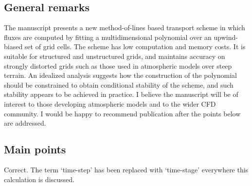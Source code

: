 \documentclass[times]{elsarticle}
\begin{document}
\subsection*{General remarks}

The manuscript presents a new method-of-lines based transport scheme
in which fluxes are computed by fitting a multidimensional
polynomial over an upwind-biased set of grid cells. The scheme
has low computation and memory costs. It is suitable for
structured and unstructured grids, and maintains accuracy
on strongly distorted grids such as those used in atmospheric models
over steep terrain. An idealized analysis suggests how the
construction of the polynomial should be constrained to obtain
conditional stability of the scheme, and such stability appears
to be achieved in practice.
I believe the manuscript will be of interest to those developing
atmospheric models and to the wider CFD community. I would be happy to
recommend publication after the points below are addressed.


\subsection*{Main points}

\begin{quotation}
\begin{comment}
\setcounter{commenti}{0}
\item It is claimed (in several places) that the scheme requires `just one
vector multiply per face per time step'. Since the two-stage Heun scheme
(2) is used, surely the cost must be two vector multiplies per face per time
step (or, more generally, one vector multiply per face per {\it stage})?
\end{comment}
\end{quotation}
Correct.  The term `time-step' has been replaced with `time-stage' everywhere this calculation is discussed.
\end{document}

